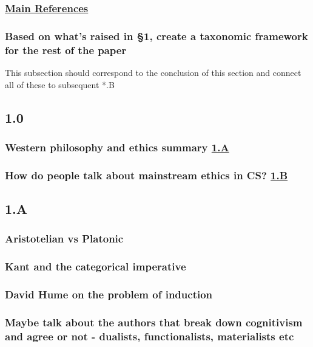 \documentclass[11pt]{article}
\begin{document}
\subsubsection{\hyperref[sec:orgaab3331]{Main References}}
\label{sec:org9bee49a}
\subsubsection{Based on what's raised in §1, create a taxonomic framework for the rest of the paper}
\label{sec:orgd2ace76}
This subsection should correspond to the conclusion of this section and connect all of these to subsequent *.B 
\subsection{1.0}
\label{sec:org6bf393e}

\subsubsection{Western philosophy and ethics summary \hyperref[sec:org96c939c]{1.A}}
\label{sec:orgaaa9f87}
\subsubsection{How do people talk about mainstream ethics in CS? \hyperref[sec:org1be32c3]{1.B}}
\label{sec:orgaf6a652}
\subsection{1.A}
\label{sec:org96c939c}

\subsubsection{Aristotelian vs Platonic}
\label{sec:org3bef0e2}
\subsubsection{Kant and the categorical imperative}
\label{sec:org2c65138}
\subsubsection{David Hume on the problem of induction}
\label{sec:orgfad2815}
\subsubsection{Maybe talk about the authors that break down cognitivism and agree or not - dualists, functionalists, materialists etc}
\label{sec:org800d2fa}
\end{document}
